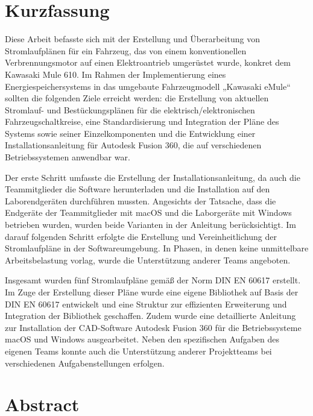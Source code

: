 \chapter*{Kurzfassung} %

Diese Arbeit befasste sich mit der Erstellung und Überarbeitung von Stromlaufplänen für ein Fahrzeug, das von einem konventionellen Verbrennungsmotor auf einen Elektroantrieb umgerüstet wurde, konkret dem Kawasaki Mule 610. Im Rahmen der Implementierung eines Energiespeichersystems in das umgebaute Fahrzeugmodell „Kawasaki eMule“ sollten die folgenden Ziele erreicht werden: die Erstellung von aktuellen Stromlauf- und Bestückungsplänen für die elektrisch/elektronischen Fahrzeugschaltkreise, eine Standardisierung und Integration der Pläne des Systems sowie seiner Einzelkomponenten und die Entwicklung einer Installationsanleitung für Autodesk Fusion 360, die auf verschiedenen Betriebssystemen anwendbar war.

Der erste Schritt umfasste die Erstellung der Installationsanleitung, da auch die Teammitglieder die Software herunterladen und die Installation auf den Laborendgeräten durchführen mussten. Angesichts der Tatsache, dass die Endgeräte der Teammitglieder mit macOS und die Laborgeräte mit Windows betrieben wurden, wurden beide Varianten in der Anleitung berücksichtigt. Im darauf folgenden Schritt erfolgte die Erstellung und Vereinheitlichung der Stromlaufpläne in der Softwareumgebung. In Phasen, in denen keine unmittelbare Arbeitsbelastung vorlag, wurde die Unterstützung anderer Teams angeboten.

Insgesamt wurden fünf Stromlaufpläne gemäß der Norm DIN EN 60617 erstellt. Im Zuge der Erstellung dieser Pläne wurde eine eigene Bibliothek auf Basis der DIN EN 60617 entwickelt und eine Struktur zur effizienten Erweiterung und Integration der Bibliothek geschaffen. Zudem wurde eine detaillierte Anleitung zur Installation der CAD-Software Autodesk Fusion 360 für die Betriebssysteme macOS und Windows ausgearbeitet. Neben den spezifischen Aufgaben des eigenen Teams konnte auch die Unterstützung anderer Projektteams bei verschiedenen Aufgabenstellungen erfolgen.

\clearpage

\chapter*{Abstract} %

